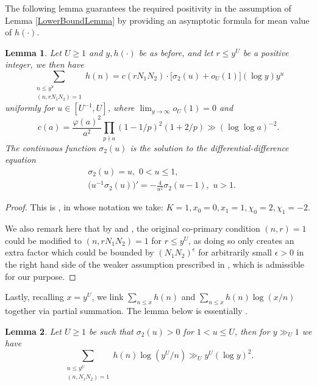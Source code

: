 \documentclass[10pt,leqno]{amsart}
\theoremstyle{plain}
\newtheorem{lemma}{Lemma}
\theoremstyle{definition}
\theoremstyle{remark}
\numberwithin{equation}{section}
\begin{document}
The following lemma guarantees the required positivity in the assumption of Lemma \ref{LowerBoundLemma} by providing an asymptotic formula for mean value of $h(\cdot)$.


\begin{lemma}\label{AsymptoticFormulasforh()}
    Let $U \geq 1$ and $y,h(\cdot)$ be as before, and let $r \leq y^U$ be a positive integer, we then have 
    \[
        \sum_{\substack{n\leq y^u \\ (n, 
        rN_1N_2)=1}}h(n) = c(rN_1N_2)\cdot \big[\sigma_2(u) + o_{U}(1)\big](\log y)y^u
    \]
    uniformly for $u \in [U^{-1}, U]$, where $\lim_{y\rightarrow \infty}o_U(1) = 0$ and 
    \[
        c(a) = \frac{\varphi(a)^2}{a^2}\prod_{p\nmid a}(1-1/p)^2(1+2/p) \gg (\log\log a)^{-2}.
    \]
    The continuous function $\sigma_2(u)$ is the solution to the differential-difference equation
    \begin{align*}
       & \sigma_2(u) = u, \,\, 0<u\leq 1, \\
       &  \big(u^{-1}\sigma_2(u)\big)' = -\frac{4}{u^2}\sigma_2(u-1),\,\, u> 1.
    \end{align*}
\end{lemma}

\begin{proof}
    This is \cite[Lemma 6]{MatomakiMR2887873}, in whose notation we take: $K = 1, x_0 = 0, x_1 = 1, \chi_0 = 2, \chi_{1} = -2$. 

    We also remark here that by \cite[Remark 7]{MatomakiMR2887873} and \cite[Lemma 4.2]{LauLiuWuMR2901268}, the original co-primary condition $(n,r)=1$ could be modified to $(n,rN_1N_2)=1$ for $r \leq y^U$, as doing so only creates an extra factor which could be bounded by $(N_1N_2)^{\epsilon}$ for arbitrarily small $\epsilon > 0$ in the right hand side of the weaker assumption prescribed in \cite[Remark 7]{MatomakiMR2887873}, which is admissible for our purpose.
\end{proof}


Lastly, recalling $x = y^U$, we link $\sum_{n\leq x}h(n)$ and $\sum_{n\leq x}h(n)\log (x/n)$ together via partial summation. The lemma below is essentially \cite[Lemma A.5]{LuoZhouMR3928043}.

\begin{lemma}\label{h()partialsummaion}
Let $U \geq 1$ be such that $\sigma_2(u) > 0$ for $1 < u \leq U$, then for
$y\gg_U 1$ we have 
\[
    \sum_{\substack{n \leq y^U \\ (n,N_1N_2)=1}}h(n)\log(y^U/n) \gg_U y^U(\log y)^2.
\]
\end{lemma}
\end{document}
